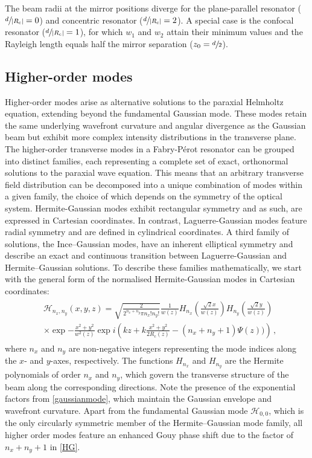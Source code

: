 \documentclass[../Thesis-IJspeert.tex]{subfiles}
\begin{document}
The beam radii at the mirror positions diverge for the plane-parallel resonator ($\sfrac{d}{\lvert R_\mathrm{c} \rvert}=0$) and concentric resonator ($\sfrac{d}{\lvert R_\mathrm{c} \rvert}=2$). A special case is the confocal resonator ($\sfrac{d}{\lvert R_\mathrm{c} \rvert}=1$), for which $w_1$ and $w_2$ attain their minimum values and the Rayleigh length equals half the mirror separation ($z_0=\sfrac{d}{2}$).

\subsection{Higher-order modes}
\label{higerordermodesection}
Higher-order modes arise as alternative solutions to the paraxial Helmholtz equation, extending beyond the fundamental Gaussian mode. These modes retain the same underlying wavefront curvature and angular divergence as the Gaussian beam but exhibit more complex intensity distributions in the transverse plane. The higher-order transverse modes in a Fabry-Pérot resonator can be grouped into distinct families, each representing a complete set of exact, orthonormal solutions to the paraxial wave equation. This means that an arbitrary transverse field distribution can be decomposed into a unique combination of modes within a given family, the choice of which depends on the symmetry of the optical system. Hermite-Gaussian modes exhibit rectangular symmetry and as such, are expressed in Cartesian coordinates. In contrast, Laguerre-Gaussian modes feature radial symmetry and are defined in cylindrical coordinates. A third family of solutions, the Ince–Gaussian modes, have an inherent elliptical symmetry and describe an exact and continuous transition between Laguerre-Gaussian and Hermite–Gaussian solutions. To describe these families mathematically, we start with the general form of the normalised Hermite-Gaussian modes in Cartesian coordinates:
\begin{align}
\label{HG}
\begin{split}
&\mathcal{H}_{n_x,n_y}(x, y, z) = \sqrt{\frac{2}{ 2^{n_x+n_y} \pi n_x!n_y!}} \frac{1}{w(z)}H_{n_x}\left(\frac{\sqrt{2}x}{w(z)}\right) H_{n_y}\left(\frac{\sqrt{2}y}{w(z)}\right)\\ &\times\exp{-\frac{x^2 + y^2}{w^2(z)}} \exp{ i\left(kz + k\frac{x^2+y^2}{2R_\mathrm{c}(z)} - (n_x+n_y+1)\Psi(z))\right) } \,,
\end{split}
\end{align}
where $n_x$ and $n_y$ are non-negative integers representing the mode indices along the $x$- and $y$-axes, respectively. The functions $H_{n_x}$ and $H_{n_y}$ are the Hermite polynomials of order $n_x$ and $n_y$, which govern the transverse structure of the beam along the corresponding directions. Note the presence of the exponential factors from \autoref{gaussianmode}, which maintain the Gaussian envelope and wavefront curvature. Apart from the fundamental Gaussian mode $\mathcal{H}_{0,0}$, which is the only circularly symmetric member of the Hermite–Gaussian mode family, all higher order modes feature an enhanced Gouy phase shift due to the factor of $n_x+n_y+1$ in \autoref{HG}.
\end{document}
